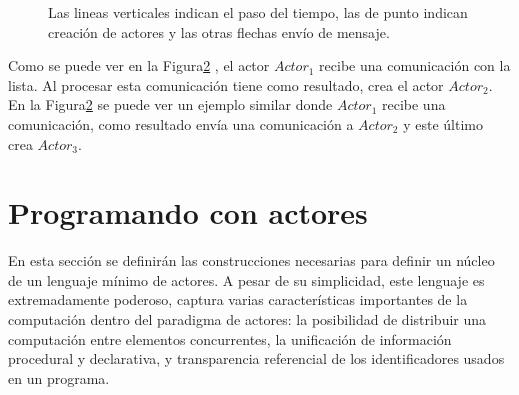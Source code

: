 \begin{figure}[H]
\begin{subfigure}{.5\textwidth}

\label{fig:actores:crecion:b}
\caption{}
\end{subfigure}

\label{fig:actores:crecion}
\caption{Las lineas verticales indican el paso del tiempo, las de punto indican creación de actores y las otras flechas envío de mensaje.}
\end{figure}

Como se puede ver en la Figura\ref{fig:actores:crecion} , el actor $Actor_1$ recibe una comunicación con la lista. Al procesar esta comunicación tiene como resultado, crea el actor $Actor_2$. En la Figura\ref{fig:actores:crecion}  se puede ver un ejemplo similar donde $Actor_1$ recibe una comunicación, como resultado envía una comunicación a $Actor_2$ y este último crea $Actor_3$.

\section{Programando con actores}

En esta sección se definirán las construcciones necesarias para definir un núcleo de un lenguaje mínimo de actores. A pesar de su simplicidad, este lenguaje es extremadamente poderoso, captura varias características importantes de la computación dentro del paradigma de actores: la posibilidad de distribuir una computación entre elementos concurrentes, la unificación de información procedural y declarativa, y transparencia referencial de los identificadores usados en un programa.

